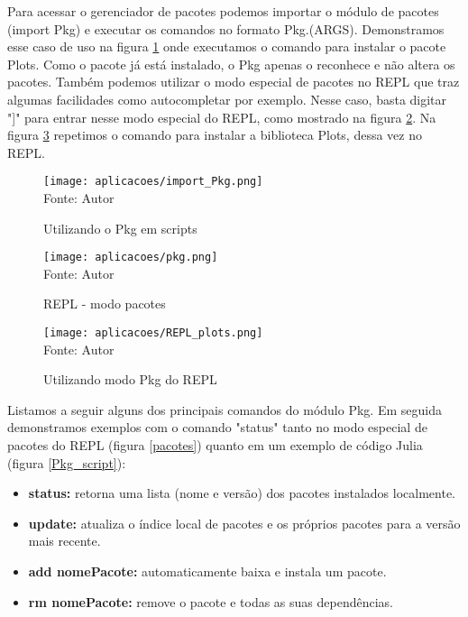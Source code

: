 Para acessar o gerenciador de pacotes podemos importar o módulo de pacotes (import Pkg) e executar os comandos no formato Pkg.(ARGS). Demonstramos esse caso de uso na figura \ref{import_Pkg} onde executamos o comando para instalar o pacote Plots. Como o pacote já está instalado, o Pkg apenas o reconhece e não altera os pacotes.
Também podemos utilizar o modo especial de pacotes no REPL que traz algumas facilidades como autocompletar por exemplo. Nesse caso, basta digitar "]" para entrar nesse modo especial do REPL, como mostrado na figura \ref{pkg}. Na figura \ref{REPL_plots} repetimos o comando para instalar a biblioteca Plots, dessa vez no REPL. 
\begin{figure}[H]
\begin{center}
    \caption{Utilizando o Pkg em scripts} \label{import_Pkg}
    \texttt{[image: aplicacoes/import\_Pkg.png]} \\
    {\tiny \sf Fonte: Autor}
\end{center}
\end{figure} 

\begin{figure}[H]
\begin{center}
    \caption{REPL - modo pacotes} \label{pkg}
    \texttt{[image: aplicacoes/pkg.png]} \\
    {\tiny \sf Fonte: Autor}
\end{center}
\end{figure} 

\begin{figure}[H]
\begin{center}
    \caption{Utilizando modo Pkg do REPL } \label{REPL_plots}
    \texttt{[image: aplicacoes/REPL\_plots.png]} \\
    {\tiny \sf Fonte: Autor}
\end{center}
\end{figure}

Listamos a seguir alguns dos principais comandos do módulo Pkg. Em seguida demonstramos exemplos com o comando "status"  tanto no modo especial de pacotes do REPL (figura \ref{pacotes}) quanto em um exemplo de código Julia (figura \ref{Pkg_script}):
\begin{itemize}
  \item \textbf{status:} retorna uma lista (nome e versão) dos pacotes instalados localmente.
  \item \textbf{update:} atualiza o índice local de pacotes e os próprios pacotes para a versão mais recente.
  \item \textbf{add nomePacote:} automaticamente baixa e instala um pacote.
  \item \textbf{rm nomePacote:} remove o pacote e todas as suas dependências.
\end{itemize}

